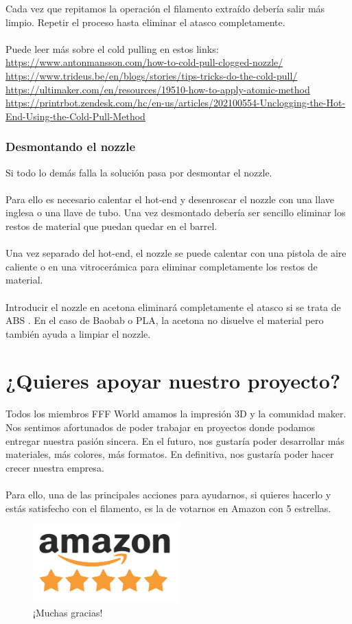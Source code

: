 \documentclass[11pt,a4paper]{article}
\begin{document}
Cada vez que repitamos la operación el filamento extraído debería salir más limpio. Repetir el proceso hasta eliminar el atasco completamente.\\\\
Puede leer más sobre el cold pulling en estos links: \url{https://www.antonmansson.com/how-to-cold-pull-clogged-nozzle/}
\url{https://www.trideus.be/en/blogs/stories/tips-tricks-do-the-cold-pull/}
\url{https://ultimaker.com/en/resources/19510-how-to-apply-atomic-method}
\url{https://printrbot.zendesk.com/hc/en-us/articles/202100554-Unclogging-the-Hot-End-Using-the-Cold-Pull-Method}
	\subsubsection{Desmontando el nozzle}
Si todo lo demás falla la solución pasa por desmontar el nozzle.\\\\
Para ello es necesario calentar el hot-end y desenroscar el nozzle con una llave inglesa o una llave de tubo. Una vez desmontado debería ser sencillo eliminar los restos de material que puedan quedar en el barrel.\\\\
Una vez separado del hot-end, el nozzle se puede calentar con una pistola de aire caliente o en una vitrocerámica para eliminar completamente los restos de material.\\\\
Introducir el nozzle en acetona eliminará completamente el atasco si se trata de ABS . En el caso de Baobab o PLA, la acetona no disuelve el material pero también ayuda a limpiar el nozzle.\section{¿Quieres apoyar nuestro proyecto?}
Todos los miembros FFF World amamos la impresión 3D y la comunidad maker. Nos sentimos afortunados de poder trabajar en proyectos donde podamos entregar nuestra pasión sincera. En el futuro, nos gustaría poder desarrollar más materiales, más colores, más formatos. En definitiva, nos gustaría poder hacer crecer nuestra empresa.
\\\\
Para ello, una de las principales acciones para ayudarnos, si quieres hacerlo y estás satisfecho con el filamento, es la de votarnos en Amazon con 5 estrellas.
\begin{figure}[H]
\centering
\includegraphics[width=0.5\textwidth,cfbox=azul_marcos 1pt 0pt]{FOTOS/AMAZON_FIVE_STARS}
\caption*{¡Muchas gracias!}
\end{figure}
\end{document}
